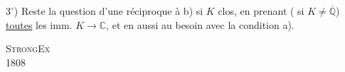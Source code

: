 $3^\circ$) Reste la question d'une réciproque à b) si $K$  clos, en prenant ( si $K\ne\overline{\mathbb Q}$) \uline{toutes} les imm. $K\longrightarrow\mathbb C$, et en  aussi au besoin avec la condition a).
\par\noindent\textsc{ Strong}\hfill\textsc{Ex}\\
 1808\hfill{}
